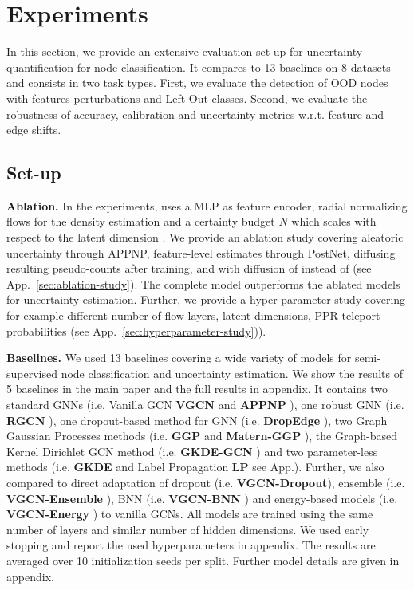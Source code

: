\section{Experiments} \label{sec:experiments}

In this section, we provide an extensive evaluation set-up for uncertainty quantification for node classification. It compares \textbf{\oursacro{}} to 13 baselines on 8 datasets and consists in two task types. First, we evaluate the detection of OOD nodes with features perturbations and Left-Out classes. Second, we evaluate the robustness of accuracy, calibration and uncertainty metrics w.r.t. feature and edge shifts.

\subsection{Set-up}

\textbf{Ablation.} In the experiments, \oursacro{} uses a MLP as feature encoder, radial normalizing flows \citep{Rezende2015} for the density estimation and a certainty budget $N$ which scales with respect to the latent dimension \citep{NatPN2021}. We provide an ablation study covering aleatoric uncertainty through APPNP, feature-level estimates through PostNet, diffusing resulting pseudo-counts after training, and \oursacro{} with diffusion of  instead of  (see App.~\ref{sec:ablation-study}). The complete \oursacro{} model outperforms the ablated models for uncertainty estimation. Further, we provide a hyper-parameter study covering for example different number of flow layers, latent dimensions, PPR teleport probabilities (see App.~\ref{sec:hyperparameter-study})). 

\textbf{Baselines.} We used 13 baselines covering a wide variety of models for semi-supervised node classification and uncertainty estimation. We show the results of 5 baselines in the main paper and the full results in appendix. It contains two standard GNNs (i.e. Vanilla GCN \textbf{VGCN} \citep{Kipf2016, Shchur2018} and \textbf{APPNP} \citep{Klicpera2018}), one robust GNN (i.e. \textbf{RGCN} \citep{Zhu2019}), one dropout-based method for GNN (i.e. \textbf{DropEdge} \citep{Rong2019}), two Graph Gaussian Processes methods (i.e. \textbf{GGP} \citep{Ng2018} and \textbf{Matern-GGP} \citep{Borovitskiy2020}), the Graph-based Kernel Dirichlet GCN method (i.e. \textbf{GKDE-GCN} \citep{Zhao2020}) and two parameter-less methods (i.e. \textbf{GKDE} \citep{Zhao2020} and Label Propagation \textbf{LP} see App.). Further, we also compared to direct adaptation of dropout (i.e. \textbf{VGCN-Dropout}\citep{Gal2016}), ensemble (i.e. \textbf{VGCN-Ensemble} \citep{Lakshminarayanan2017}), BNN (i.e. \textbf{VGCN-BNN} \citep{Blundell2015}) and energy-based models (i.e. \textbf{VGCN-Energy} \citep{Liu2020a}) to vanilla GCNs. All models are trained using the same number of layers and similar number of hidden dimensions. We used early stopping and report the used hyperparameters in appendix. The results are averaged over 10 initialization seeds per split. Further model details are given in appendix.

